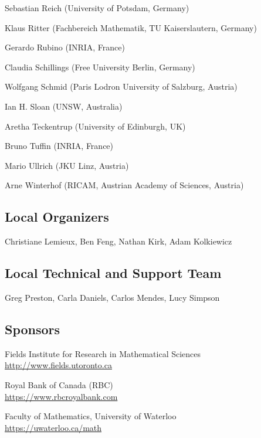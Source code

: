 \begin{multicols}{2}
Sebastian Reich (University of Potsdam, Germany)

Klaus Ritter (Fachbereich Mathematik, TU Kaiserslautern, Germany)

Gerardo Rubino (INRIA, France)

Claudia Schillings (Free University Berlin, Germany)

Wolfgang Schmid (Paris Lodron University of Salzburg, Austria)

Ian H. Sloan (UNSW, Australia)

Aretha Teckentrup (University of Edinburgh, UK)

Bruno Tuffin (INRIA, France)

Mario Ullrich (JKU Linz, Austria)

Arne Winterhof (RICAM, Austrian Academy of Sciences, Austria)

\end{multicols}




\clearpage



\subsection{Local Organizers}
\update{}

Christiane Lemieux, Ben Feng, Nathan Kirk, Adam Kolkiewicz

\subsection{Local Technical and Support Team}
Greg Preston, Carla Daniels, Carlos Mendes, Lucy Simpson


\subsection{Sponsors}



Fields Institute for Research in Mathematical Sciences\\
\url{http://www.fields.utoronto.ca}

Royal Bank of Canada (RBC)\\
\url{https://www.rbcroyalbank.com}

Faculty of Mathematics, University of Waterloo\\
\url{https://uwaterloo.ca/math}

